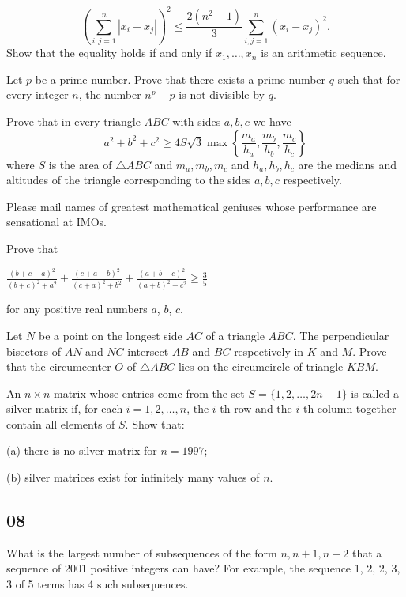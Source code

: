 \[ \left(\sum_{i,j=1}^{n}|x_i-x_j|\right)^2\le\frac{2(n^2-1)}{3}\sum_{i,j=1}^{n}(x_i-x_j)^2. \]
Show that the equality holds if and only if $x_1, \ldots, x_n$ is an arithmetic sequence.
\eq

Let $p$ be a prime number. Prove that there exists a prime number $q$ such that for every integer $n$, the number $n^p-p$ is not divisible by $q$.
\eq

\bq{}{}
Prove that in every triangle $ABC$ with sides $a,b,c$ we have
\[a^2+b^2+c^2 \ge 4S\sqrt3\max\left\{\frac{m_a}{h_a}, \frac{m_b}{h_b}, \frac{m_c}{h_c} \right\}\]
where $S$ is the area of $\triangle ABC$ and $m_a, m_b, m_c$ and $h_a, h_b, h_c$ are the medians and altitudes of the triangle corresponding to the sides $a,b,c$ respectively.
\eq

\bq{}{}
Please mail names of greatest mathematical geniuses whose performance are sensational at IMOs.
\eq

Prove that

$ \frac{\left(b+c-a\right)^{2}}{\left(b+c\right)^{2}+a^{2}}+\frac{\left(c+a-b\right)^{2}}{\left(c+a\right)^{2}+b^{2}}+\frac{\left(a+b-c\right)^{2}}{\left(a+b\right)^{2}+c^{2}}\geq\frac35$

for any positive real numbers $ a$, $ b$, $ c$.
\eq

\bq{}{}
Let $N$ be a point on the longest side $AC$ of a triangle $ABC$. The perpendicular bisectors of $AN$ and $NC$ intersect $AB$ and $BC$ respectively in $K$ and $M$. Prove that the circumcenter $O$ of $\triangle ABC$ lies on the circumcircle of triangle $KBM$.
\eq

An $ n \times n$ matrix whose entries come from the set $ S = \{1, 2, \ldots , 2n - 1\}$ is called a silver matrix if, for each $ i = 1, 2, \ldots , n$, the $ i$-th row and the $ i$-th column together contain all elements of $ S$. Show that:

(a) there is no silver matrix for $ n = 1997$;

(b) silver matrices exist for infinitely many values of $ n$.
\eq

\newpage
\subsection{08}
What is the largest number of subsequences of the form $n, n+1, n+2$ that a sequence of 2001 positive integers can have? For example, the sequence {1, 2, 2, 3, 3} of 5 terms has 4 such subsequences.
\eq

